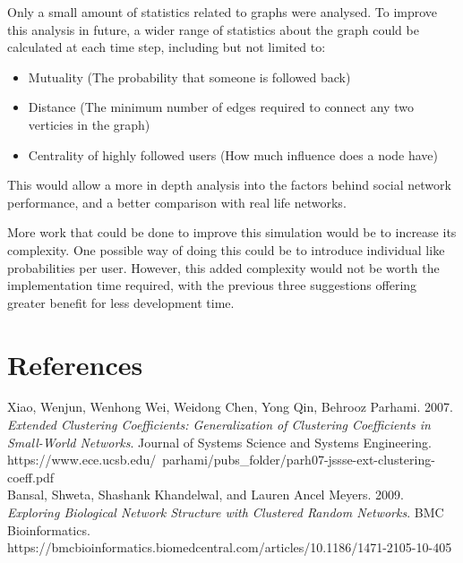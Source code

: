 \documentclass{article}
\begin{document}
Only a small amount of statistics related to graphs were analysed. To improve this
analysis in future, a wider range of statistics about the graph could be calculated at each time step,
including but not limited to:
\begin{itemize}
\item Mutuality (The probability that someone is followed back)
\item Distance (The minimum number of edges required to connect any two verticies in the graph)
\item Centrality of highly followed users (How much influence does a node have)
\end{itemize}
This would allow a more in depth analysis into the factors behind social network performance, and a better
comparison with real life networks.

More work that could be done to improve this simulation would be to increase
its complexity. One possible way of doing this could be to introduce
individual like probabilities per user. However,
this added complexity would not be worth the implementation time required,
with the previous three suggestions offering greater benefit for less development
time.

\section{References}
Xiao, Wenjun, Wenhong Wei, Weidong Chen, Yong Qin, Behrooz Parhami. 2007.
\textit{Extended Clustering Coefficients: Generalization of Clustering Coefficients in Small-World
Networks}. Journal of Systems Science and Systems Engineering. https://www.ece.ucsb.edu/~parhami/pubs\_folder/parh07-jssse-ext-clustering-coeff.pdf\\

Bansal, Shweta, Shashank Khandelwal, and Lauren Ancel Meyers. 2009. \textit{Exploring Biological Network Structure with Clustered Random Networks}.
BMC Bioinformatics. https://bmcbioinformatics.biomedcentral.com/articles/10.1186/1471-2105-10-405
\end{document}
